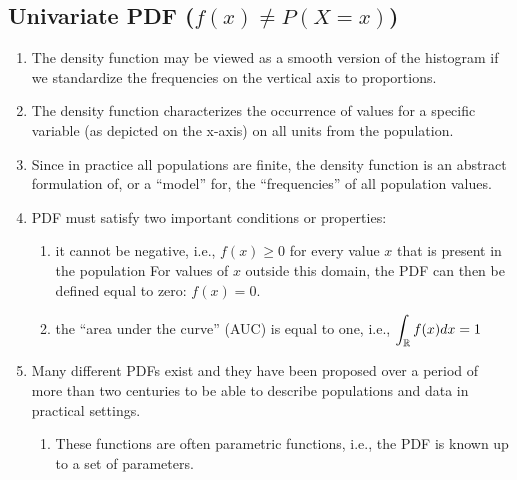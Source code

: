 \subsection{Univariate PDF ($f(x) \neq P(X = x)$)}

\begin{enumerate}
    \item The density function may be viewed as a smooth version of the histogram if we standardize the frequencies on the vertical axis to proportions.
    \hfill \cite{statistics/book/Statistics-for-Data-Scientists/Maurits-Kaptein}

    \item The density function characterizes the occurrence of values for a specific variable (as depicted on the x-axis) on all units from the population.
    \hfill \cite{statistics/book/Statistics-for-Data-Scientists/Maurits-Kaptein}

    \item Since in practice all populations are finite, the density function is an abstract formulation of, or a “model” for, the “frequencies” of all population values.
    \hfill \cite{statistics/book/Statistics-for-Data-Scientists/Maurits-Kaptein}

    \item PDF must satisfy two important conditions or properties:
    \hfill \cite{statistics/book/Statistics-for-Data-Scientists/Maurits-Kaptein}
    \begin{enumerate}
        \item  it cannot be negative, i.e., $f (x) \geq 0$ for every value $x$ that is present in the population
        For values of $x$ outside this domain, the PDF can then be defined equal to zero: $f (x) = 0$.
        \hfill \cite{statistics/book/Statistics-for-Data-Scientists/Maurits-Kaptein}

        \item  the “area under the curve” (AUC) is equal to one, i.e., $\displaystyle\int_{\mathbb{R}} f(x) dx = 1$
        \hfill \cite{statistics/book/Statistics-for-Data-Scientists/Maurits-Kaptein}
    \end{enumerate}

    \item Many different PDFs exist and they have been proposed over a period of more than two centuries to be able to describe populations and data in practical settings.
    \hfill \cite{statistics/book/Statistics-for-Data-Scientists/Maurits-Kaptein}
    \begin{enumerate}
        \item These functions are often parametric functions, i.e., the PDF is known up to a set of parameters.
        \hfill \cite{statistics/book/Statistics-for-Data-Scientists/Maurits-Kaptein}


\end{enumerate}
\end{enumerate}

